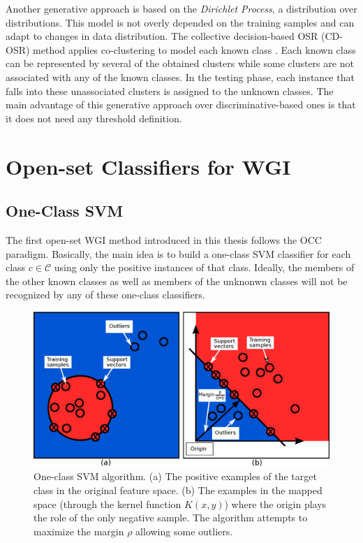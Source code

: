 Another generative approach is based on the \textit{Dirichlet Process}, a distribution over distributions. This model is not overly depended on the training samples and can adapt to changes in data distribution. The collective decision-based OSR (CD-OSR) method applies co-clustering to model each known class \parencite{geng2018collective}. Each known class can be represented by several of the obtained clusters while some clusters are not associated with any of the known classes. In the testing phase, each instance that falls into these unassociated clusters is assigned to the unknown classes. The main advantage of this generative approach over discriminative-based ones is that it does not need any threshold definition.

\section{Open-set Classifiers for WGI}
\label{chap:openset:sec:Open_set_classifiers_for_WGI}

\subsection{One-Class SVM}\label{chap:openset:sec:OCSVM_description}

The first open-set WGI method introduced in this thesis follows the OCC paradigm. Basically, the main idea is to build a one-class SVM classifier for each class $c \in \mathcal{C}$ using only the positive instances of that class. Ideally, the members of the other known classes as well as members of the unknonwn classes will not be recognized by any of these one-class classifiers.

\begin{figure}[t]
	\begin{center}
    	\includegraphics[scale=0.70]{Figures/OCSVM_diagrams.eps}
		\caption{One-class SVM algorithm. (a) The positive examples of the target class in the original feature space. (b) The examples in the mapped space (through the kernel function $K(x,y)$) where the origin plays the role of the only negative sample. The algorithm attempts to maximize the margin $\rho$ allowing some outliers.}
		\label{chap:openset:fig:ocsvm_single_class}
	\end{center}
\end{figure}

